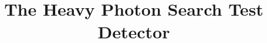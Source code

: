 \documentclass[final,3p,times,twocolumn]{elsarticle}
\begin{document}
\begin{frontmatter}






\title{The Heavy Photon Search Test Detector}










\end{frontmatter}
\end{document}
